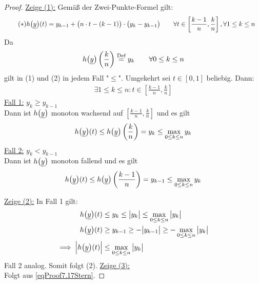 \begin{proof}
\underline{Zeige (1):}
Gemäß der Zwei-Punkte-Formel gilt:
\begin{align}\label{eqProof7.17Stern}\tag{$\ast$}
h\big(\underline{y}\big)(t)
&=y_{k-1}+\big(n\cdot t-(k-1)\big)\cdot\big(y_k-y_{k-1}\big)
\qquad\forall t\in\left[\frac{k-1}{n},\frac{k}{n}\right],\forall 1\leq k\leq n
\end{align}
Da
\begin{align*}
h\big(\underline{y}\big)\left(\frac{k}{n}\right)\overset{\text{Def}}{=}y_k\qquad\forall 0\leq k\leq n
\end{align*}
gilt in (1) und (2) in jedem Fall "$\leq$". Umgekehrt sei $t\in[0,1]$ beliebig. Dann:
\begin{align*}
\exists 1\leq k\leq n:t\in\left[\frac{k-1}{n},\frac{k}{n}\right]
\end{align*}
\underline{Fall 1:} $y_k\geq y_{k-1}$\\
Dann ist $h\big(\underline{y}\big)$ monoton wachsend auf $\left[\frac{k-1}{n},\frac{k}{n}\right]$ und es gilt
\begin{align*}
h\big(\underline{y}\big)(t)\leq h\big(\underline{y}\big)\left(\frac{k}{n}\right)=y_k\leq\max\limits_{0\leq k\leq n} y_k
\end{align*}
\underline{Fall 2:} $y_k<y_{k-1}$\\
Dann ist $h\big(\underline{y}\big)$ monoton fallend und es gilt
\begin{align*}
h\big(\underline{y}\big)(t)\leq h\big(\underline{y}\big)\left(\frac{k-1}{n}\right)=y_{k-1}\leq\max\limits_{0\leq k\leq n}y_k
\end{align*}

\underline{Zeige (2):} In Fall 1 gilt:
\begin{align*}
h\big(\underline{y}\big)(t)&\leq y_k\leq\big|y_k\big|\leq\max\limits_{0\leq k\leq n}\big|y_k\big|\\
h\big(\underline{y}\big)(t)&\geq y_{k-1}\geq-\big|y_{k-1}\big|\geq-\max\limits_{0\leq k\leq n}\big|y_k\big|\\
\implies
\Big|h\big(\underline{y}\big)(t)\Big|&\leq\max\limits_{0\leq k\leq n}\big| y_k\big|
\end{align*}
Fall 2 analog. Somit folgt (2).\nl
\underline{Zeige (3):}\\
Folgt aus \eqref{eqProof7.17Stern}.
\end{proof}

